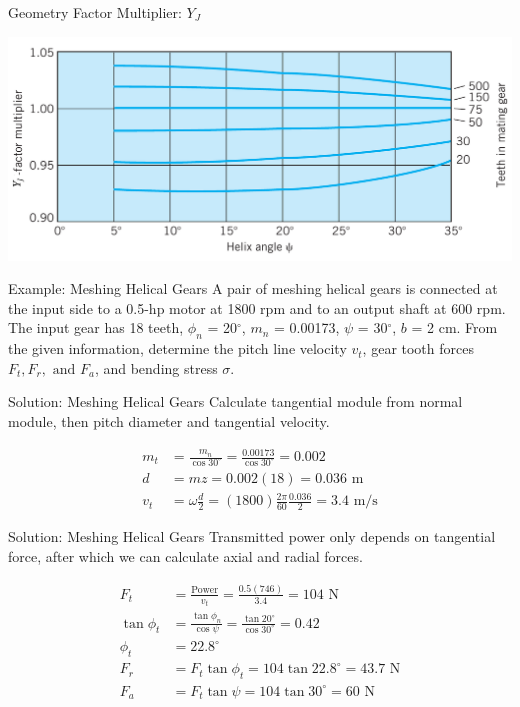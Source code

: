 \documentclass[10pt, svgnames]{beamer}
\begin{document}
\begin{frame}[label={sec:org6c5dcf6}]{Geometry Factor Multiplier: \(Y_{J}\)}
\begin{center}
\includegraphics[width=.9\linewidth]{pictures/geometry-factor-multiplier-helical.png}
\end{center}
\end{frame}

\begin{frame}[label={sec:orgf1c0ddd}]{Example: Meshing Helical Gears}
A pair of meshing helical gears is connected at the input side to a 0.5-hp motor at 1800 rpm and to an output shaft at 600 rpm. The input gear has 18 teeth, \(\phi_{n}\) = 20\(^{\circ}\), \(m_{n}\) = 0.00173, \(\psi\) = 30\(^{\circ}\), \(b\) = 2 cm. From the given information, determine the pitch line velocity \(v_{t}\), gear tooth forces \(F_{t}, F_{r}, \text{ and } F_{a}\), and bending stress \(\sigma\).
\end{frame}

\begin{frame}[label={sec:org8f2732a}]{Solution: Meshing Helical Gears}
Calculate tangential module from normal module, then pitch diameter and tangential velocity.

\begin{align*}
    m_{t} &= \frac{m_{n}}{\cos 30^{\circ}} = \frac{0.00173}{\cos 30^{\circ}} = 0.002 \\
    d &= mz = 0.002(18) = 0.036 \text{ m} \\
    v_{t} &= \omega \frac{d}{2}  = (1800) \frac{2\pi}{60} \frac{0.036}{2} = 3.4 \text{ m/s}
\end{align*}
\end{frame}

\begin{frame}[label={sec:orgc3e9518}]{Solution: Meshing Helical Gears}
Transmitted power only depends on tangential force, after which we can calculate axial and radial forces.

\begin{align*}
    F_{t} &= \frac{\text{Power}}{v_{t}} = \frac{0.5(746)}{3.4} = 104 \text{ N} \\
    \tan \phi_{t} &= \frac{\tan \phi_{n}}{\cos \psi} = \frac{\tan 20^{\circ}}{\cos 30^{\circ}} = 0.42 \\
    \phi_{t} &= 22.8^{\circ} \\
    F_{r} &= F_{t}\tan \phi_{t} = 104 \tan 22.8^{\circ} = 43.7 \text{ N} \\
    F_{a} &= F_{t} \tan \psi = 104 \tan 30^{\circ} = 60 \text{ N}
\end{align*}
\end{frame}
\end{document}
